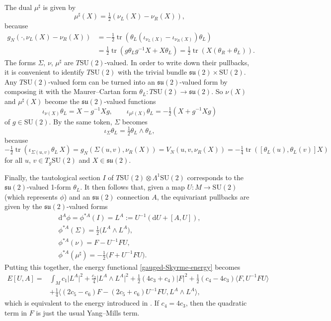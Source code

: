 \documentclass[pdftex]{sigma}
\newcommand{\su}{{\mathfrak{su}}}
\newcommand{\SU}{{\mathrm{SU}}}
\newcommand{\1}{{\mathbb{1}}}
\def \d{\mathrm{d}}
\newcommand{\tr}{{\operatorname{tr}}}
\numberwithin{equation}{section}
\begin{document}
The dual $\mu^\sharp$ is given by
\begin{equation}\label{moment-map-adjoint-round-sphere-choice}
\mu^\sharp(X)=\tfrac{1}{2}(\nu_L(X)-\nu_R(X)),
\end{equation}
because
\begin{align*}
 g_N(\cdot,\nu_L(X)-\nu_R(X))& =-\tfrac{1}{2}\tr(\theta_L(\iota_{\nu_L(X)}-\iota_{\nu_R(X)})\theta_L)\\
 & =\tfrac{1}{2}\tr(g\theta_Lg^{-1}X+X\theta_L)=\tfrac{1}{2}\tr(X(\theta_R+\theta_L)).
\end{align*}
The forms $\Sigma$, $\nu$, $\mu^\sharp$ are $T\SU(2)$-valued. In order to write down their pullbacks, it is convenient to identify $T\SU(2)$ with the trivial bundle $\su(2)\times \SU(2)$. Any $T\SU(2)$-valued form can be turned into an $\su(2)$-valued form by composing it with the Maurer--Cartan form $\theta_L\colon T\SU(2)\to\su(2)$. So $\nu(X)$ and $\mu^\sharp(X)$ become the $\su(2)$-valued functions
\begin{equation*}
\iota_{\nu(X)}\theta_L = X-g^{-1}Xg,\qquad \iota_{\mu^\sharp(X)}\theta_L = -\tfrac{1}{2}(X+g^{-1}Xg)
\end{equation*}
of $g\in\SU(2)$. By the same token, $\Sigma$ becomes
\begin{equation*}
\iota_\Sigma \theta_L=\tfrac{1}{2}\theta_L\wedge\theta_L,
\end{equation*}
because
\begin{equation*}
-\tfrac{1}{2}\tr(\iota_{\Sigma(u,v)}\theta_L\,X) = g_N(\Sigma(u,v),\nu_R(X)) = V_N(u,v,\nu_R(X)) = -\tfrac{1}{4}\tr([\theta_L(u),\theta_L(v)]X)
\end{equation*}
for all $u$, $v\in T_g\SU(2)$ and $X\in\su(2)$.

Finally, the tautological section $I$ of $T\SU(2)\otimes\Lambda^1\SU(2)$ corresponds to the $\su(2)$-valued \mbox{1-form} $\theta_L$. It then follows that, given a map $U\colon M\to \SU(2)$ (which represents $\phi$) and an $\su(2)$ connection $A$, the equivariant pullbacks are given by the $\su(2)$-valued forms
\begin{gather*}
\d^A\phi=\phi^{\ast A}(I)=L^A:=U^{-1}(\d U+[A,U]),\\
\phi^{\ast A}(\Sigma)=\tfrac{1}{2}\bigl(L^A\wedge L^A\bigr),\\
\phi^{\ast A}(\nu)=F-U^{-1}F U,\\
\phi^{\ast A}(\mu^\sharp) = -\tfrac{1}{2}\bigl(F+U^{-1}F U\bigr).
\end{gather*}
Putting this together, the energy functional \eqref{gauged-Skyrme-energy} becomes
\begin{align}\label{CHW-energu}
E[U,A]=&\int_Mc_1\big|L^A\big|^2+\tfrac{c_2}{4}\big|L^A\wedge L^A\big|^2+\tfrac{1}{2}(4c_3+c_4)|F|^2+\tfrac{1}{2}(c_4-4c_3)\big\langle F,U^{-1}FU\big\rangle\nonumber\\
&+\tfrac{1}{4}\big\langle (2c_5-c_6)F-(2c_5+c_6)U^{-1}F U,L^A\wedge L^A\big\rangle,
\end{align}
which is equivalent to the energy introduced in \cite{CorkHarlandWinyard2021gaugedskyrmelowbinding}. If $c_4=4c_3$, then the quadratic term in $F$ is just the usual Yang--Mills term.
\end{document}
